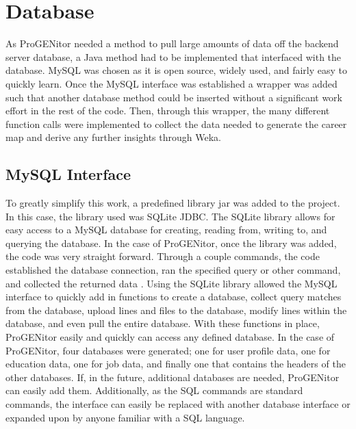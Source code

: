 \section{Database}
\label{sect:database}
As ProGENitor needed a method to pull large amounts of data off the backend
server database, a Java method had to be implemented that interfaced with
the database.  MySQL was chosen as it is open source, widely used, and fairly
easy to quickly learn.  Once the MySQL interface was established a wrapper was
added such that another database method could be inserted without a significant
work effort in the rest of the code.  Then, through this wrapper, the many
different function calls were implemented to collect the data needed to generate
the career map and derive any further insights through Weka.

\subsection{MySQL Interface}
To greatly simplify this work, a predefined library jar was added
to the project.  In this case, the library used was SQLite JDBC.  The SQLite
library allows for easy access to a MySQL database for creating, reading from,
writing to, and querying the database.  In the case of ProGENitor, once the
library was added, the code was very straight forward.  Through a couple
commands, the code established the database connection, ran the specified query
or other command, and collected the returned data \cite{sqlite}.  Using the
SQLite library allowed the MySQL interface to quickly add in functions to create
a database, collect query matches from the database, upload lines and files to
the database, modify lines within the database, and even pull the entire
database.  With these functions in place, ProGENitor easily and quickly can
access any defined database.  In the case of ProGENitor, four databases were
generated; one for user profile data, one for education data, one for job data,
and finally one that contains the headers of the other databases.  If, in the
future, additional databases are needed, ProGENitor can easily add them. 
Additionally, as the SQL commands are standard commands, the interface can
easily be replaced with another database interface or expanded upon by anyone
familiar with a SQL language.

